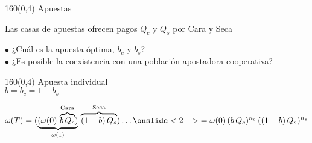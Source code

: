 \documentclass[shownotes,aspectratio=169]{beamer}
\begin{document}
\begin{frame}[plain]
\begin{textblock}{160}(0,4)
 \centering \LARGE Apuestas
\end{textblock}
\vspace{1cm}

Las casas de apuestas ofrecen pagos $Q_c$ y $Q_s$ por Cara y Seca

\vspace{1cm} \pause

$\bullet$ ¿Cuál es la apuesta óptima, $b_c$ y $b_s$? \\ \pause
$\bullet$ ¿Es posible la coexistencia con una población apostadora cooperativa?

\end{frame}



\begin{frame}[plain]
\begin{textblock}{160}(0,4)
 \centering \LARGE Apuesta individual \\
 \Large $b = b_c = 1 - b_s$
\end{textblock}
\vspace{1.5cm} 

\begin{equation*}
\omega(T) = (\underbrace{(\omega(0) \, \overbrace{b \,  Q_c}^{\text{Cara}})}_{\omega(1)} \, \overbrace{(1-b) \, Q_s}^{\text{Seca}}) \dots \onslide<2->{= \omega(0) \,  (b \,  Q_c)^{n_c}  \,  ((1-b) \, Q_s)^{n_s}}
\end{equation*}


\end{frame}
\end{document}
